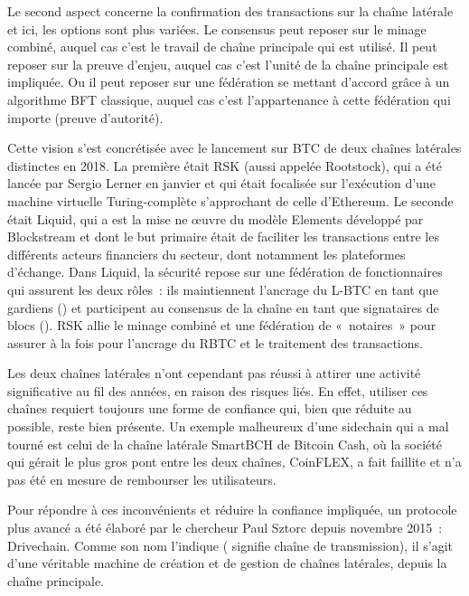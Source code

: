 Le second aspect concerne la confirmation des transactions sur la chaîne latérale et ici, les options sont plus variées. Le consensus peut reposer sur le minage combiné, auquel cas c'est le travail de chaîne principale qui est utilisé. Il peut reposer sur la preuve d'enjeu, auquel cas c'est l'unité de la chaîne principale est impliquée. Ou il peut reposer sur une fédération se mettant d'accord grâce à un algorithme BFT classique, auquel cas c'est l'appartenance à cette fédération qui importe (preuve d'autorité).

Cette vision s'est concrétisée avec le lancement sur BTC de deux chaînes latérales distinctes en 2018. La première était RSK (aussi appelée Rootstock), qui a été lancée par Sergio Lerner en janvier et qui était focalisée sur l'exécution d'une machine virtuelle Turing-complète s'approchant de celle d'Ethereum. Le seconde était Liquid, qui a est la mise ne œuvre du modèle Elements développé par Blockstream et dont le but primaire était de faciliter les transactions entre les différents acteurs financiers du secteur, dont notamment les plateformes d'échange. Dans Liquid, la sécurité repose sur une fédération de fonctionnaires qui assurent les deux rôles~: ils maintiennent l'ancrage du L-BTC en tant que gardiens () et participent au consensus de la chaîne en tant que signataires de blocs (). RSK allie le minage combiné et une fédération de «~notaires~» pour assurer à la fois pour l'ancrage du RBTC et le traitement des transactions.

Les deux chaînes latérales n'ont cependant pas réussi à attirer une activité significative au fil des années, en raison des risques liés. En effet, utiliser ces chaînes requiert toujours une forme de confiance qui, bien que réduite au possible, reste bien présente. Un exemple malheureux d'une sidechain qui a mal tourné est celui de la chaîne latérale SmartBCH de Bitcoin Cash, où la société qui gérait le plus gros pont entre les deux chaînes, CoinFLEX, a fait faillite et n'a pas été en mesure de rembourser les utilisateurs.


Pour répondre à ces inconvénients et réduire la confiance impliquée, un protocole plus avancé a été élaboré par le chercheur Paul Sztorc depuis novembre 2015~: Drivechain. Comme son nom l'indique ( signifie chaîne de transmission), il s'agit d'une véritable machine de création et de gestion de chaînes latérales, depuis la chaîne principale.

